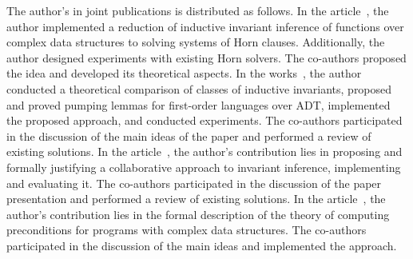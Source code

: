 

The author's {\contribution} in joint publications is distributed as follows.
In the article~\cite{костюков2019автоматическое}, the author implemented a reduction of inductive invariant inference of functions over complex data structures to solving systems of Horn clauses. Additionally, the author designed experiments with existing Horn solvers. The co-authors proposed the idea and developed its theoretical aspects.
In the works~\cite{10.1145/3453483.3454055}, the author conducted a theoretical comparison of classes of inductive invariants, proposed and proved pumping lemmas for first-order languages over ADT, implemented the proposed approach, and conducted experiments. The co-authors participated in the discussion of the main ideas of the paper and performed a review of existing solutions.
In the article~\cite{LPAR2023:Collaborative_Inference_of_Combined}, the author's contribution lies in proposing and formally justifying a collaborative approach to invariant inference, implementing and evaluating it. The co-authors participated in the discussion of the paper presentation and performed a review of existing solutions.
In the article~\cite{мисонижник2022генерация}, the author's contribution lies in the formal description of the theory of computing preconditions for programs with complex data structures. The co-authors participated in the discussion of the main ideas and implemented the approach.
